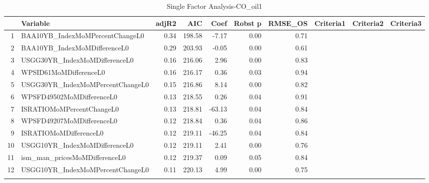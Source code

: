 \begin{longtable}{rlrrrrrlll}
  \hline
 & Variable & adjR2 & AIC & Coef & Robst p & RMSE\_OS & Criteria1 & Criteria2 & Criteria3 \\ 
  \hline
1 & BAA10YB\_IndexMoMPercentChangeL0 & 0.34 & 198.58 & -7.17 & 0.00 & 0.71 &  &  &  \\ 
  2 & BAA10YB\_IndexMoMDifferenceL0 & 0.29 & 203.93 & -0.05 & 0.00 & 0.61 &  &  &  \\ 
  3 & USGG30YR\_IndexMoMDifferenceL0 & 0.16 & 216.06 & 2.96 & 0.00 & 0.83 &  &  &  \\ 
  4 & WPSID61MoMDifferenceL0 & 0.16 & 216.17 & 0.36 & 0.03 & 0.94 &  &  &  \\ 
  5 & USGG30YR\_IndexMoMPercentChangeL0 & 0.15 & 216.86 & 8.14 & 0.00 & 0.82 &  &  &  \\ 
  6 & WPSFD49502MoMDifferenceL0 & 0.13 & 218.55 & 0.26 & 0.04 & 0.91 &  &  &  \\ 
  7 & ISRATIOMoMPercentChangeL0 & 0.13 & 218.81 & -63.13 & 0.04 & 0.84 &  &  &  \\ 
  8 & WPSFD49207MoMDifferenceL0 & 0.12 & 218.84 & 0.36 & 0.04 & 0.86 &  &  &  \\ 
  9 & ISRATIOMoMDifferenceL0 & 0.12 & 219.11 & -46.25 & 0.04 & 0.84 &  &  &  \\ 
  10 & USGG10YR\_IndexMoMDifferenceL0 & 0.12 & 219.11 & 2.41 & 0.00 & 0.76 &  &  &  \\ 
  11 & ism\_man\_pricesMoMDifferenceL0 & 0.12 & 219.37 & 0.09 & 0.05 & 0.84 &  &  &  \\ 
  12 & USGG10YR\_IndexMoMPercentChangeL0 & 0.11 & 220.13 & 4.99 & 0.00 & 0.75 &  &  &  \\ 
   \hline
\hline
\caption{Single Factor Analysis-CO_oil1} 
\end{longtable}
